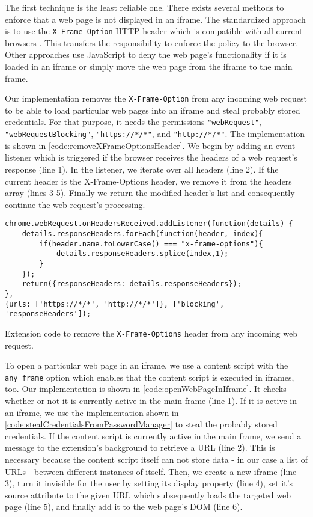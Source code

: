 	The first technique is the least reliable one. There exists several methods to enforce that a web page is not displayed in an iframe. The standardized approach is to use the \texttt{X-Frame-Option} HTTP header which is compatible with all current browsers \cite{xFrameOptionsSpezification, xFrameOptionsCompability}. This transfers the responsibility to enforce the policy to the browser. Other approaches use JavaScript to deny the web page's functionality if it is loaded in an iframe or simply move the web page from the iframe to the main frame.
	
	Our implementation removes the \texttt{X-Frame-Option} from any incoming web request to be able to load particular web pages into an iframe and steal probably stored credentials. For that purpose, it needs the permissions \texttt{"webRequest"}, \texttt{"webRequestBlocking"}, \texttt{"https://*/*"}, and \texttt{"http://*/*"}. The implementation is shown in \autoref{code:removeXFrameOptionsHeader}. We begin by adding an event listener which is triggered if the browser receives the headers of a web request's response (line 1). In the listener, we iterate over all headers (line 2). If the current header is the X-Frame-Options header, we remove it from the headers array (lines 3-5). Finally we return the modified header's list and consequently continue the web request's processing.
	
	\begin{code}
		\begin{lstlisting}
chrome.webRequest.onHeadersReceived.addListener(function(details) { 
	details.responseHeaders.forEach(function(header, index){
		if(header.name.toLowerCase() === "x-frame-options"){
			details.responseHeaders.splice(index,1);
		}
	});
	return({responseHeaders: details.responseHeaders});
},
{urls: ['https://*/*', 'http://*/*']}, ['blocking', 'responseHeaders']);
\end{lstlisting}
		\caption{Extension code to remove the \texttt{X-Frame-Options} header from any incoming web request.}
		\label{code:removeXFrameOptionsHeader}
	\end{code} 
	
	To open a particular web page in an iframe, we use a content script with the \texttt{any\_frame} option which enables that the content script is executed in iframes, too. Our implementation is shown in \autoref{code:openWebPageInIframe}. It checks whether or not it is currently active in the main frame (line 1). If it is active in an iframe, we use the implementation shown in \autoref{code:stealCredentialsFromPasswordManager} to steal the probably stored credentials. If the content script is currently active in the main frame, we send a message to the extension's background to retrieve a URL (line 2). This is necessary because the content script itself can not store data - in our case a list of URLs - between different instances of itself. Then, we create a new iframe (line 3), turn it invisible for the user by setting its display property (line 4), set it's source attribute to the given URL which subsequently loads the targeted web page (line 5), and finally add it to the web page's DOM (line 6). 
	
